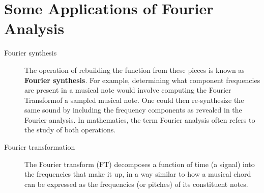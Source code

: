 \documentclass{article}
\newcommand{\FT}{Fourier Transform}
\begin{document}
\section{Some Applications of Fourier Analysis}
\begin{description}
    \item[Fourier synthesis] The operation of rebuilding the function from these pieces is known as \textbf{Fourier synthesis}. For example, determining what component frequencies are present in a musical note would involve computing the \FT of a sampled musical note. One could then re-synthesize the same sound by including the frequency components as revealed in the Fourier analysis. In mathematics, the term Fourier analysis often refers to the study of both operations.

    \item[Fourier transformation] The Fourier transform (FT) decomposes a function of time (a signal) into the frequencies that make it up, in a way similar to how a musical chord can be expressed as the frequencies (or pitches) of its constituent notes.
\end{description}
\end{document}

